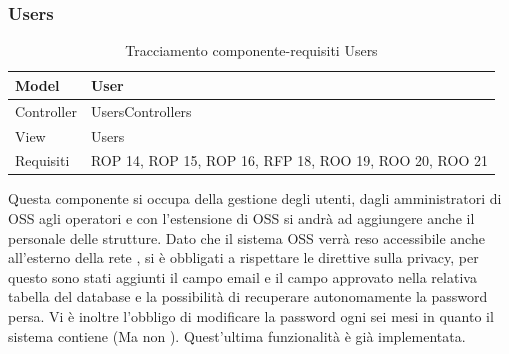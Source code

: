 \subsubsection{Users}
\def\arraystretch{2}
\begin{table}[H]
\centering
\begin{tabular}{|l|l|}
\hline
Model & User \\ \hline
Controller & UsersControllers \\ \hline
View & Users \\ \hline
Requisiti & ROP 14, ROP 15, ROP 16, RFP 18, ROO 19, ROO 20, ROO 21 \\ \hline
\end{tabular}
\caption{Tracciamento componente-requisiti Users}
\end{table}
Questa componente si occupa della gestione degli utenti, dagli amministratori di OSS agli operatori e con l'estensione di OSS si andrà ad aggiungere anche il personale delle strutture.
Dato che il sistema OSS verrà reso accessibile anche all'esterno della rete \net, si è obbligati a rispettare le direttive sulla privacy, per questo sono stati aggiunti il campo email e il campo approvato nella relativa tabella del database  e la possibilità di recuperare autonomamente la password persa. Vi è inoltre l'obbligo di modificare la password ogni sei mesi in quanto il sistema contiene  (Ma non ).
Quest'ultima funzionalità è già implementata.

\begin{table}[H]
\centering
{}
\caption{Controller:UsersController}
\end{table}



